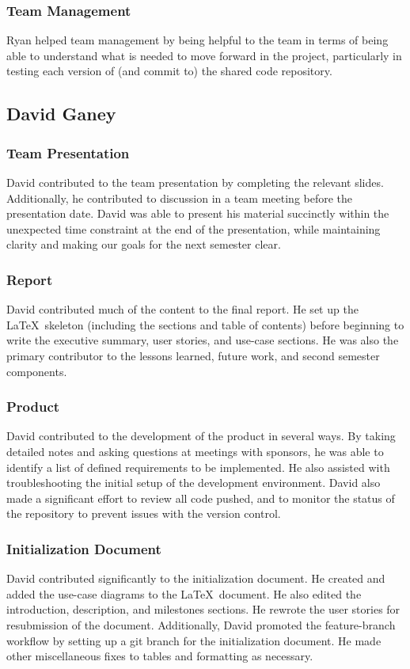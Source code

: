 \documentclass[12pt]{article}
\begin{document}
\begin{spacing}{1.5}
\subsubsection{Team Management}
Ryan helped team management by being helpful to the team in terms of being able to understand what is needed to move forward in the project, particularly in testing each version of (and commit to) the shared code repository. 

\clearpage

\subsection{David Ganey}
\subsubsection{Team Presentation}
David contributed to the team presentation by completing the relevant slides. Additionally, he contributed to discussion in a team meeting before the presentation date. David was able to present his material succinctly within the unexpected time constraint at the end of the presentation, while maintaining clarity and making our goals for the next semester clear.
\subsubsection{Report}
David contributed much of the content to the final report. He set up the \LaTeX\ skeleton (including the sections and table of contents) before beginning to write the executive summary, user stories, and use-case sections. He was also the primary contributor to the lessons learned, future work, and second semester components.
\subsubsection{Product}
David contributed to the development of the product in several ways. By taking detailed notes and asking questions at meetings with sponsors, he was able to identify a list of defined requirements to be implemented. He also assisted with troubleshooting the initial setup of the development environment. David also made a significant effort to review all code pushed, and to monitor the status of the repository to prevent issues with the version control.
\subsubsection{Initialization Document}
David contributed significantly to the initialization document. He created and added the use-case diagrams to the \LaTeX\ document. He also edited the introduction, description, and milestones sections. He rewrote the user stories for resubmission of the document. Additionally, David promoted the feature-branch workflow by setting up a git branch for the initialization document. He made other miscellaneous fixes to tables and formatting as necessary.

\end{spacing}
\end{document}

